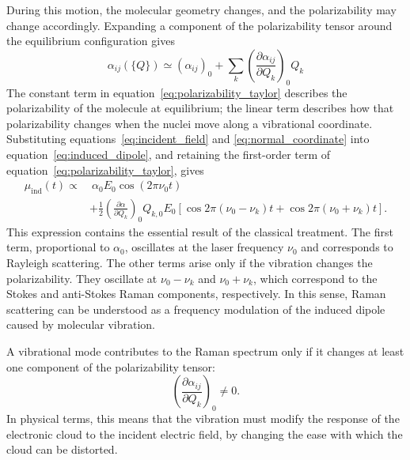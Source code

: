 During this motion, the molecular geometry changes, and the polarizability may change accordingly. Expanding a component of the polarizability tensor around the equilibrium configuration gives
\begin{equation}
    \alpha_{ij}(\{Q\}) \simeq
    \left(\alpha_{ij}\right)_0 +
    \sum_k
    \left(\frac{\partial \alpha_{ij}}{\partial Q_k}\right)_0 Q_k  
    \label{eq:polarizability_taylor}
\end{equation}
The constant term in equation~\eqref{eq:polarizability_taylor} describes the polarizability of the molecule at equilibrium; the linear term describes how that polarizability changes when the nuclei move along a vibrational coordinate. Substituting equations~\eqref{eq:incident_field} and \eqref{eq:normal_coordinate} into equation~\eqref{eq:induced_dipole}, and retaining the first-order term of equation~\eqref{eq:polarizability_taylor}, gives
\begin{equation}
\begin{split}
    \mu_{\mathrm{ind}}(t) \propto
    &\ \alpha_0 E_0 \cos(2\pi \nu_0 t) \\
    &+ \frac{1}{2}
    \left(\frac{\partial \alpha}{\partial Q_k}\right)_0
    Q_{k,0}E_0
    \left[
        \cos 2\pi(\nu_0-\nu_k)t +
        \cos 2\pi(\nu_0+\nu_k)t
    \right].
\end{split}
\label{eq:induced_dipole_components}
\end{equation}
This expression contains the essential result of the classical treatment. The first term, proportional to \(\alpha_0\), oscillates at the laser frequency \(\nu_0\) and corresponds to Rayleigh scattering.  The other terms arise only if the vibration changes the polarizability. They oscillate at \(\nu_0-\nu_k\) and \(\nu_0+\nu_k\), which correspond to the Stokes and anti-Stokes Raman components, respectively. In this sense, Raman scattering can be understood as a frequency modulation of the induced dipole caused by molecular vibration.

A vibrational mode contributes to the Raman spectrum only if it changes at least one component of the polarizability tensor:
\begin{equation}
    \left(\frac{\partial \alpha_{ij}}{\partial Q_k}\right)_0 \neq 0.
    \label{eq:raman_activity}
\end{equation}
In physical terms, this means that the vibration must modify the response of the electronic cloud to the incident electric field, by changing the ease with which the cloud can be distorted.


